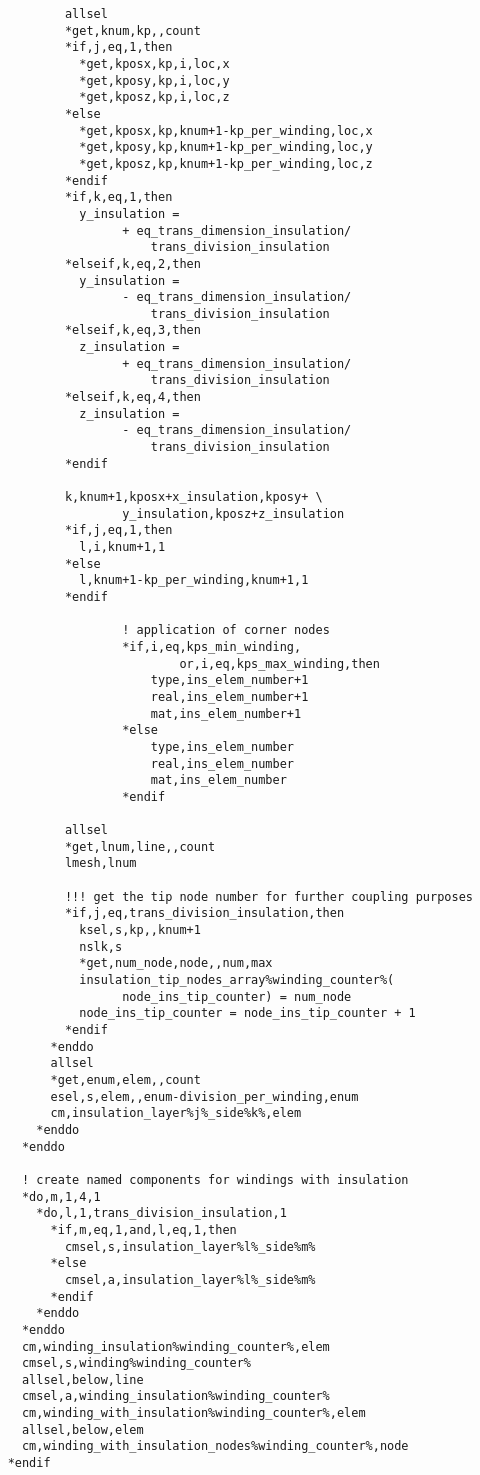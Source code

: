 \begin{verbatim}
            allsel
            *get,knum,kp,,count
            *if,j,eq,1,then
              *get,kposx,kp,i,loc,x
              *get,kposy,kp,i,loc,y
              *get,kposz,kp,i,loc,z
            *else
              *get,kposx,kp,knum+1-kp_per_winding,loc,x
              *get,kposy,kp,knum+1-kp_per_winding,loc,y
              *get,kposz,kp,knum+1-kp_per_winding,loc,z
            *endif
            *if,k,eq,1,then
              y_insulation = 
                    + eq_trans_dimension_insulation/
                        trans_division_insulation
            *elseif,k,eq,2,then
              y_insulation = 
                    - eq_trans_dimension_insulation/
                        trans_division_insulation
            *elseif,k,eq,3,then
              z_insulation = 
                    + eq_trans_dimension_insulation/
                        trans_division_insulation
            *elseif,k,eq,4,then
              z_insulation = 
                    - eq_trans_dimension_insulation/
                        trans_division_insulation
            *endif

            k,knum+1,kposx+x_insulation,kposy+ \ 
                    y_insulation,kposz+z_insulation
            *if,j,eq,1,then
              l,i,knum+1,1
            *else
              l,knum+1-kp_per_winding,knum+1,1
            *endif

            		! application of corner nodes
            		*if,i,eq,kps_min_winding,
            		        or,i,eq,kps_max_winding,then
            			type,ins_elem_number+1
            			real,ins_elem_number+1
            			mat,ins_elem_number+1
            		*else
            			type,ins_elem_number
            			real,ins_elem_number
            			mat,ins_elem_number
            		*endif
		
            allsel
            *get,lnum,line,,count
            lmesh,lnum

            !!! get the tip node number for further coupling purposes
            *if,j,eq,trans_division_insulation,then
              ksel,s,kp,,knum+1
              nslk,s
              *get,num_node,node,,num,max
              insulation_tip_nodes_array%winding_counter%(
                    node_ins_tip_counter) = num_node
              node_ins_tip_counter = node_ins_tip_counter + 1
            *endif
          *enddo
          allsel
          *get,enum,elem,,count
          esel,s,elem,,enum-division_per_winding,enum
          cm,insulation_layer%j%_side%k%,elem
        *enddo
      *enddo

      ! create named components for windings with insulation
      *do,m,1,4,1
        *do,l,1,trans_division_insulation,1
          *if,m,eq,1,and,l,eq,1,then
            cmsel,s,insulation_layer%l%_side%m%
          *else
            cmsel,a,insulation_layer%l%_side%m%
          *endif
        *enddo
      *enddo
      cm,winding_insulation%winding_counter%,elem
      cmsel,s,winding%winding_counter%
      allsel,below,line
      cmsel,a,winding_insulation%winding_counter%
      cm,winding_with_insulation%winding_counter%,elem
      allsel,below,elem
      cm,winding_with_insulation_nodes%winding_counter%,node
    *endif


\end{verbatim}
